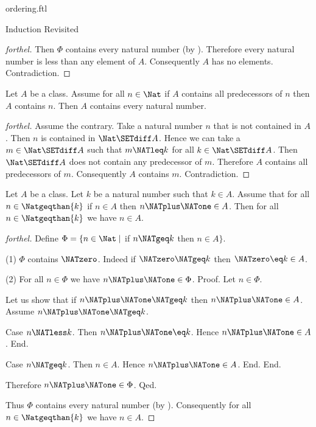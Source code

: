 \documentclass{naproche-library}
\begin{document}
\begin{smodule}[title=The Standard Ordering of the Natural Numbers]{ordering.ftl}
\begin{sfragment}{Induction Revisited}
\begin{proof}[forthel]
    Then $\Phi$ contains every natural number (by ).
    Therefore every natural number is less than any element of $A$.
    Consequently $A$ has no elements.
    Contradiction.
  \end{proof}

  \begin{theorem}[forthel,id=ARITHMETIC_04_3609801697263616]
    Let $A$ be a class.
    Assume for all $n \in \Nat$ if $A$ contains all predecessors of $n$ then $A$ contains $n$.
    Then $A$ contains every natural number.
  \end{theorem}
  \begin{proof}[forthel]
    Assume the contrary.
    Take a natural number $n$ that is not contained in $A$.
    Then $n$ is contained in $\Nat \SETdiff A$.
    Hence we can take a $m \in \Nat \SETdiff A$ such that $m \NATleq k$ for all $k \in \Nat \SETdiff A$.
    Then $\Nat \SETdiff A$ does not contain any predecessor of $m$.
    Therefore $A$ contains all predecessors of $m$.
    Consequently $A$ contains $m$.
    Contradiction.
  \end{proof}

  \begin{theorem}[forthel,id=ARITHMETIC_04_4976599269113856]
    Let $A$ be a class.
    Let $k$ be a natural number such that $k \in A$.
    Assume that for all $n \in \Natgeqthan{k}$ if $n \in A$ then $n \NATplus \NATone \in A$.
    Then for all $n \in \Natgeqthan{k}$ we have $n \in A$.
  \end{theorem}
  \begin{proof}[forthel]
    Define $\Phi = \{n \in \Nat \mid$ if $n \NATgeq k$ then $n \in A \}$.

    (1) $\Phi$ contains $\NATzero$.
    Indeed if $\NATzero \NATgeq k$ then $\NATzero \eq k \in A$.

    (2) For all $n \in \Phi$ we have $n \NATplus \NATone \in \Phi$. \newline
    Proof.
      Let $n \in \Phi$.

      Let us show that if $n \NATplus \NATone \NATgeq k$ then $n \NATplus \NATone \in A$.
        Assume $n \NATplus \NATone \NATgeq k$.

        Case $n \NATless k$.
          Then $n \NATplus \NATone \eq k$.
          Hence $n \NATplus \NATone \in A$.
        End.

        Case $n \NATgeq k$.
          Then $n \in A$.
          Hence $n \NATplus \NATone \in A$.
        End.
      End.

      Therefore $n \NATplus \NATone \in \Phi$.
    Qed.

    Thus $\Phi$ contains every natural number (by ).
    Consequently for all $n \in \Natgeqthan{k}$ we have $n \in A$.
  \end{proof}
\end{sfragment}
\end{smodule}
\end{document}
